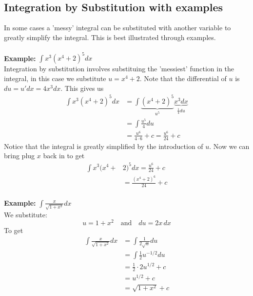 \documentclass{report}
\begin{document}
\subsection{Integration by Substitution with examples} %
In some cases a 'messy' integral can be substituted with another variable
to greatly simplify the integral. This is best illustrated through examples.\\
\vspace{1mm}\\
\textbf{Example:} $\int x^3(x^4+2)^5dx$\\
Integration by substitution involves substituing the 'messiest' function in the integral,
in this case we substitute $u=x^4+2$. Note that the differential of $u$ 
is $du=u'dx=4x^3dx$. This gives us
\begin{align*}
\int x^3(x^4+2)^5dx&=\int\underbrace{(x^4+2)^5}_{u^5}
\underbrace{x^3dx}_{\frac{1}{4}du}\\
&=\int\frac{u^5}{4}du\\
&=\frac{u^6}{4\cdot6}+c=\frac{u^6}{24}+c
\end{align*}
Notice that the integral is greatly simplified by the introduction of $u$. Now we 
can bring plug $x$ back in to get
\begin{align*}
\int x^3(x^4+&2)^5dx=\frac{u^6}{24}+c\\
&=\frac{(x^4+2)^6}{24}+c
\end{align*}
\vspace{1mm}\\
\textbf{Example:} $\int\frac{x}{\sqrt{1+x^2}}dx$\\
We substitute:
\begin{equation*}
u=1+x^2\quad\text{and}\quad du=2x\,dx
\end{equation*}
To get
\begin{align*}
\int\frac{x}{\sqrt{1+x^2}}dx&=
\int\frac{1}{2\sqrt{u}}du\\
&=\int\frac{1}{2}u^{-1/2}du\\
&=\frac{1}{2}\cdot2u^{1/2}+c\\
&=u^{1/2}+c\\
&=\sqrt{1+x^2}+c
\end{align*}
\newpage
\end{document}
